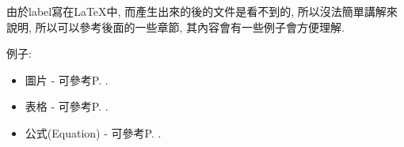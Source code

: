 由於label寫在LaTeX中, 而產生出來的後的文件是看不到的, 所以沒法簡單講解來說明, 所以可以參考後面的一些章節, 其內容會有一些例子會方便理解.

例子:
\begin{itemize}
  \item 圖片 - 可參考P. .

  \item 表格 - 可參考P. .

  \item 公式(Equation) - 可參考P. .
\end{itemize}


